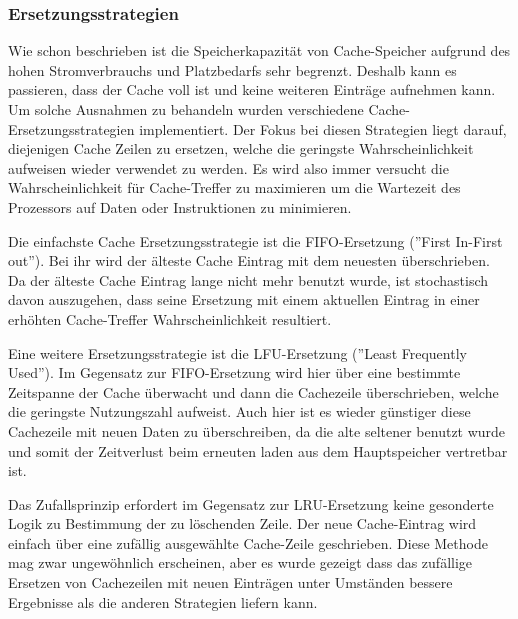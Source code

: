 \documentclass[12pt]{article}
\begin{document}
\subsubsection{Ersetzungsstrategien}
 Wie schon beschrieben ist die Speicherkapazität von Cache-Speicher aufgrund des hohen Stromverbrauchs und Platzbedarfs sehr begrenzt. Deshalb kann es passieren, dass der Cache voll ist und keine weiteren Einträge aufnehmen kann. Um solche Ausnahmen zu behandeln wurden verschiedene Cache-Ersetzungsstrategien implementiert. Der Fokus bei diesen Strategien liegt darauf, diejenigen Cache Zeilen zu ersetzen, welche die geringste Wahrscheinlichkeit aufweisen wieder verwendet zu werden. Es wird also immer versucht die Wahrscheinlichkeit für Cache-Treffer zu maximieren um die Wartezeit des Prozessors auf Daten oder Instruktionen zu minimieren. \cite{mikroprozessortechnik2011}


\noindent Die einfachste Cache Ersetzungsstrategie ist die FIFO-Ersetzung (''First In-First out''). Bei ihr wird der älteste Cache Eintrag mit dem neuesten überschrieben. Da der älteste Cache Eintrag lange nicht mehr benutzt wurde, ist stochastisch davon auszugehen, dass seine Ersetzung mit einem aktuellen Eintrag in einer erhöhten Cache-Treffer Wahrscheinlichkeit resultiert.

\noindent Eine weitere Ersetzungsstrategie ist die LFU-Ersetzung (''Least Frequently Used''). Im Gegensatz zur FIFO-Ersetzung wird hier über eine bestimmte Zeitspanne der Cache überwacht und dann die Cachezeile überschrieben, welche die geringste Nutzungszahl aufweist. Auch hier ist es wieder günstiger diese Cachezeile mit neuen Daten zu überschreiben, da die alte seltener benutzt wurde und somit der Zeitverlust beim erneuten laden aus dem Hauptspeicher vertretbar ist.

\noindent Das Zufallsprinzip erfordert im Gegensatz zur LRU-Ersetzung keine gesonderte Logik zu Bestimmung der zu löschenden Zeile. Der neue Cache-Eintrag wird einfach über eine zufällig ausgewählte Cache-Zeile geschrieben. Diese Methode mag zwar ungewöhnlich erscheinen, aber es wurde gezeigt dass das zufällige Ersetzen von Cachezeilen mit neuen Einträgen unter Umständen bessere Ergebnisse als die anderen Strategien liefern kann.\cite[S.185ff]{mikroprozessortechnik2011} \cite{smith1985instruction}

\end{document}
